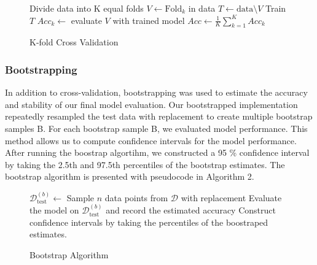 \begin{figure}[H]
    \begin{algorithm}[H]
    \caption{K-fold Cross Validation \cite{K-foldCrossValidation}}
    \label{algo:kfold}
        \begin{algorithmic}[1]
            \State Divide data into K equal folds 
                \State $V \gets \text{Fold}_{k}$ in data
                \State $T \gets \text{data} \setminus V$
                \State Train $T$
                \State $Acc_k \gets$ evaluate $V$ with trained model
            \EndFor
            \State $Acc \gets \frac{1}{K} \sum_{k=1}^{K} Acc_k$
             \EndProcedure
        \end{algorithmic}
    \end{algorithm}
\end{figure}

\subsubsection{Bootstrapping}

In addition to cross-validation, bootstrapping was used to estimate the accuracy and stability of our final model evaluation. Our bootstrapped implementation repeatedly resampled the test data with replacement to create multiple bootstrap samples B. For each bootstrap sample B, we evaluated model performance. This method allows us to compute confidence intervals for the model performance. After running the boostrap algortihm, we constructed a 95 \% confidence interval by taking the 2.5th and 97.5th percentiles of the bootstrap estimates. The bootstrap algorithm is presented with pseudocode in Algorithm 2. \cite{hastie2009elements}

\begin{figure}[H]
    \begin{algorithm}[H]
    \caption{Bootstrap Algorithm}
    \label{algo:bootstrap}
        \begin{algorithmic}[1]
                \State $\mathcal{D}^{(b)}_{\text{test}} \gets$ Sample $n$ data points from $\mathcal{D}$ with replacement
                \State Evaluate the model on $\mathcal{D}^{(b)}_{\text{test}}$ and record the estimated accuracy
            \EndFor
            \State Construct confidence intervals by taking the percentiles of the boostraped estimates.
            \EndProcedure
        \end{algorithmic}
    \end{algorithm}
\end{figure}

